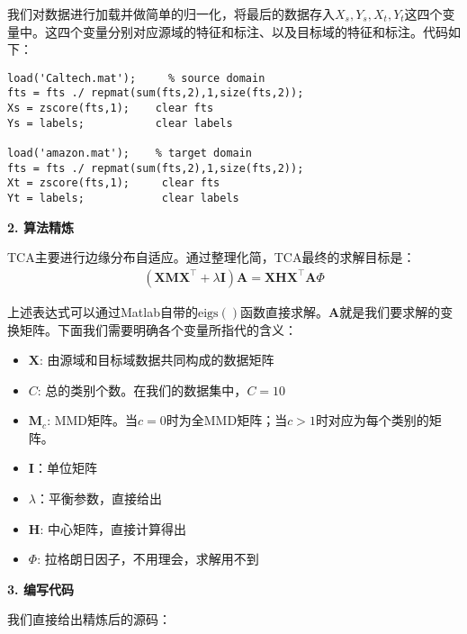 我们对数据进行加载并做简单的归一化，将最后的数据存入$X_s,Y_s,X_t,Y_t$这四个变量中。这四个变量分别对应源域的特征和标注、以及目标域的特征和标注。代码如下：

\begin{lstlisting}[title=Matlab加载数据, frame=shadowbox]
load('Caltech.mat');     % source domain
fts = fts ./ repmat(sum(fts,2),1,size(fts,2)); 
Xs = zscore(fts,1);    clear fts
Ys = labels;           clear labels

load('amazon.mat');    % target domain
fts = fts ./ repmat(sum(fts,2),1,size(fts,2)); 
Xt = zscore(fts,1);     clear fts
Yt = labels;            clear labels
\end{lstlisting}

\textbf{2. 算法精炼}

TCA主要进行边缘分布自适应。通过整理化简，TCA最终的求解目标是：
\begin{equation}
\label{equ-eigen}
\begin{split}
\left(\mathbf{X} \mathbf{M} \mathbf{X}^\top + \lambda \mathbf{I}\right) \mathbf{A} =\mathbf{X} \mathbf{H} \mathbf{X}^\top \mathbf{A} \Phi 
\end{split}
\end{equation}

上述表达式可以通过Matlab自带的$\mathrm{eigs()}$函数直接求解。$\mathbf{A}$就是我们要求解的变换矩阵。下面我们需要明确各个变量所指代的含义：

\begin{itemize}
	\item $\mathbf{X}$: 由源域和目标域数据共同构成的数据矩阵
	\item $C$: 总的类别个数。在我们的数据集中，$C=10$
	\item $\mathbf{M}_c$: MMD矩阵。当$c=0$时为全MMD矩阵；当$c>1$时对应为每个类别的矩阵。
	\item $\mathbf{I}$：单位矩阵
	\item $\lambda$：平衡参数，直接给出
	\item $\mathbf{H}$: 中心矩阵，直接计算得出
	\item $\Phi$: 拉格朗日因子，不用理会，求解用不到
\end{itemize}

\textbf{3. 编写代码}

我们直接给出精炼后的源码：

